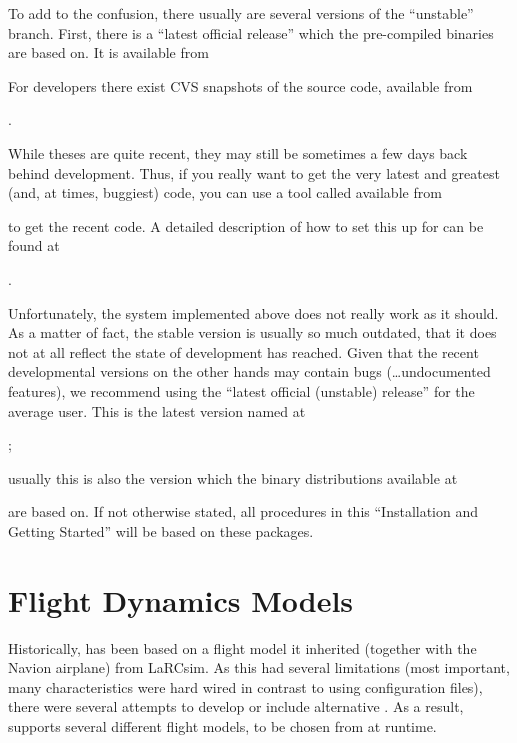 To add to the confusion, there usually are several versions of the ``unstable''
branch. First, there is a ``latest official release'' which the pre-compiled binaries are based
on.  It is available from
\medskip

\medskip

For developers there exist CVS snapshots of the
source code, available from
 \medskip

.
 \medskip

 \noindent
While theses are quite recent, they may still be sometimes a few days back behind
development. Thus, if you really want to get the very latest and greatest (and, at times,
buggiest) code, you can use a tool called 
available from
 \medskip

 \medskip

 \noindent
to get the recent code. A detailed description of how to set this up for \FlightGear{}
can be found at
 \medskip

.
 \medskip

 \noindent
 Unfortunately, the system implemented above does not really work as it should. As a matter of
 fact, the stable version is usually so much outdated, that it does not at all reflect the state
 of development \FlightGear{} has reached. Given that the recent developmental versions on the
 other hands may contain bugs (\ldots undocumented features), we recommend using the
 ``latest official (unstable) release'' for the average user. This is the latest version named at

 ;
 \medskip

\noindent
 usually this is also the version which the binary distributions
 available at
 \medskip

 \medskip

 \noindent
 are based on. If not otherwise stated, all procedures in this ``Installation and Getting Started''
 will be based on these packages.

\section{Flight Dynamics Models\label{flightmodels}}
Historically, \FlightGear{} has been based on a flight model it inherited (together
with the Navion airplane) from LaRCsim. As this had several limitations (most important,
many characteristics were hard wired in contrast to using configuration files), there were
several attempts to develop or include alternative . As a result,
\FlightGear{} supports several different flight models, to be chosen from at runtime.

